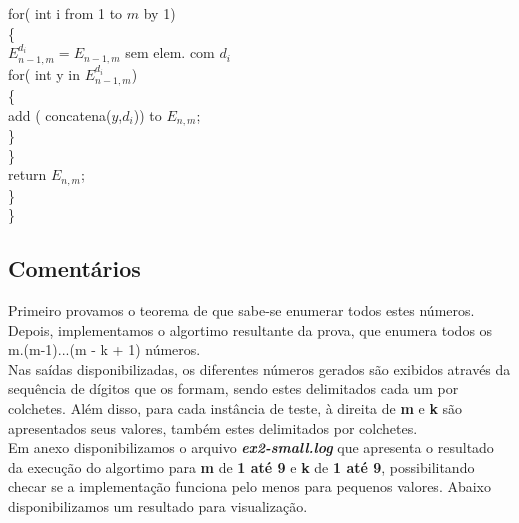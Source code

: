 \documentclass[twoside]{article}
\begin{document}
\begin{multicols}{2}
\hspace*{10mm} {\color[rgb]{0.7,0.3,0} for}({\color[rgb]{0,0,1} int} i {\color[rgb]{0.7,0.3,0} from} 1 {\color[rgb]{0.7,0.3,0} to} $m$ {\color[rgb]{0.7,0.3,0} by} 1)\\
\hspace*{10mm} \{\\
\hspace*{15mm} $E_{n-1,m}^{d_i} = E_{n-1,m}$ {\color[rgb]{0,0.5,0.5}sem elem. com} $d_i$\\
\hspace*{15mm} {\color[rgb]{0.7,0.3,0} for}({\color[rgb]{0,0,1} int} y {\color[rgb]{0.7,0.3,0} in} $E_{n-1,m}^{d_i}$)\\
\hspace*{15mm} \{\\
\hspace*{20mm} {\color[rgb]{0,0.5,0.5} add} ({\color[rgb]{0,0.5,0.5} concatena}($y$,$d_i$)) {\color[rgb]{0,0.5,0.5} to} $E_{n,m}$;\\
\hspace*{15mm} \}\\
\hspace*{10mm} \}\\
\hspace*{10mm} {\color[rgb]{0.5,0,1} return}  $E_{n,m}$;\\
\hspace*{5mm} \}\\
\}

\subsection{ Comentários }
\indent  Primeiro provamos o teorema de que sabe-se enumerar todos estes números. Depois, implementamos o algortimo resultante da prova, que enumera todos os m.(m-1)...(m - k + 1) números.\\

\indent Nas saídas disponibilizadas, os diferentes números gerados são exibidos através da sequência de dígitos que os formam, sendo estes delimitados cada um por colchetes. Além disso, para cada instância de teste, à direita de \textbf{m} e \textbf{k} são apresentados seus valores, também estes delimitados por colchetes.\\

\indent Em anexo disponibilizamos o arquivo \textbf{\textit{ex2-small.log}} que apresenta o resultado da execução do algortimo para \textbf{m} de \textbf{1 até 9} e \textbf{k} de \textbf{1 até 9}, possibilitando checar se a implementação funciona pelo menos para pequenos valores. Abaixo disponibilizamos um resultado para visualização.\\\\


\end{multicols}
\end{document}
